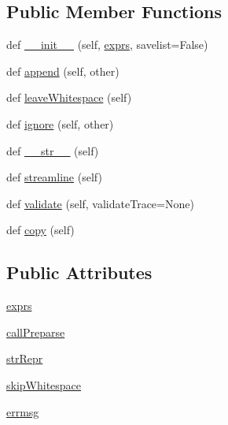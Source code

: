 \subsection*{Public Member Functions}
\begin{DoxyCompactItemize}
\item 
def \hyperlink{classpyparsing_1_1ParseExpression_a96277673ff049eb205436f38ce992b8e}{\+\_\+\+\_\+init\+\_\+\+\_\+} (self, \hyperlink{classpyparsing_1_1ParseExpression_a18a085fff96b65ee97761c3bf27d3675}{exprs}, savelist=False)
\item 
def \hyperlink{classpyparsing_1_1ParseExpression_abada45f40f50e3af1b116c9a6415783e}{append} (self, other)
\item 
def \hyperlink{classpyparsing_1_1ParseExpression_a1e4852ec80e22dda41a04ef4d50c2d0e}{leave\+Whitespace} (self)
\item 
def \hyperlink{classpyparsing_1_1ParseExpression_a54c92a5a537788667c6c4dc23baad08d}{ignore} (self, other)
\item 
def \hyperlink{classpyparsing_1_1ParseExpression_af253f5a299fbe870ea66c77ae27f00da}{\+\_\+\+\_\+str\+\_\+\+\_\+} (self)
\item 
def \hyperlink{classpyparsing_1_1ParseExpression_af0cf6b8eb503efa6caba81566dcaec4a}{streamline} (self)
\item 
def \hyperlink{classpyparsing_1_1ParseExpression_a9f19b6c229dda324c1ac3e56cc1466cc}{validate} (self, validate\+Trace=None)
\item 
def \hyperlink{classpyparsing_1_1ParseExpression_a9c4e9073b2dc85a99daa904d844cfc6b}{copy} (self)
\end{DoxyCompactItemize}
\subsection*{Public Attributes}
\begin{DoxyCompactItemize}
\item 
\hyperlink{classpyparsing_1_1ParseExpression_a18a085fff96b65ee97761c3bf27d3675}{exprs}
\item 
\hyperlink{classpyparsing_1_1ParseExpression_ae0b6f3d9aab3f5a91776f26ec23148b6}{call\+Preparse}
\item 
\hyperlink{classpyparsing_1_1ParseExpression_a3e71321064c9df98204afa8716336636}{str\+Repr}
\item 
\hyperlink{classpyparsing_1_1ParseExpression_ab92a722a01195374f5ac0157fa5a87ce}{skip\+Whitespace}
\item 
\hyperlink{classpyparsing_1_1ParseExpression_a3bdb0d5c90395583a6690823904e2fec}{errmsg}
\end{DoxyCompactItemize}
